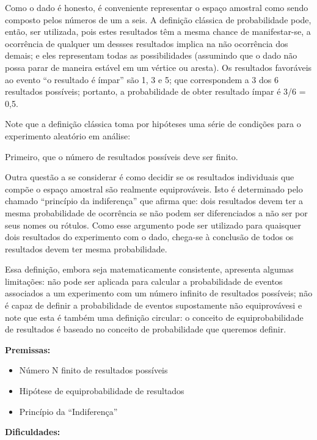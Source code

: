 \documentclass[
]{book}
\providecommand{\tightlist}{%
  \setlength{\itemsep}{0pt}\setlength{\parskip}{0pt}}
\theoremstyle{definition}
\theoremstyle{definition}
\theoremstyle{definition}
\theoremstyle{remark}
\begin{document}
Como o dado é honesto, é conveniente representar o espaço amostral como sendo composto pelos números de um a seis. A definição clássica de probabilidade pode, então, ser utilizada, pois estes resultados têm a mesma chance de manifestar-se, a ocorrência de qualquer um dessses resultados implica na não ocorrência dos demais; e eles representam todas as possibilidades (assumindo que o dado não possa parar de maneira estável em um vértice ou aresta). Os resultados favoráveis ao evento ``o resultado é ímpar'' são 1, 3 e 5; que correspondem a 3 dos 6 resultados possíveis; portanto, a probabilidade de obter resultado ímpar é 3/6 = 0,5.

Note que a definição clássica toma por hipóteses uma série de condições para o experimento aleatório em análise:

Primeiro, que o número de resultados possíveis deve ser finito.

Outra questão a se considerar é como decidir se os resultados individuais que compõe o espaço amostral são realmente equiprováveis. Isto é determinado pelo chamado ``princípio da indiferença'' que afirma que: dois resultados devem ter a mesma probabilidade de ocorrência se não podem ser diferenciados a não ser por seus nomes ou rótulos. Como esse argumento pode ser utilizado para quaisquer dois resultados do experimento com o dado, chega-se à conclusão de todos os resultados devem ter mesma probabilidade.

Essa definição, embora seja matematicamente consistente, apresenta algumas limitações: não pode ser aplicada para calcular a probabilidade de eventos associados a um experimento com um número infinito de resultados possíveis; não é capaz de definir a probabilidade de eventos supostamente não equiprovávesi e note que esta é também uma definição circular: o conceito de equiprobabilidade de resultados é baseado no conceito de probabilidade que queremos definir.

\textbf{Premissas:}

\begin{itemize}
\tightlist
\item
  Número N finito de resultados possíveis\\
\item
  Hipótese de equiprobabilidade de resultados\\
\item
  Princípio da ``Indiferença''
\end{itemize}

\textbf{Dificuldades:}
\end{document}
